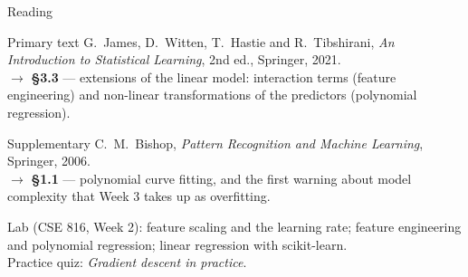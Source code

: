 \documentclass[aspectratio=169,10pt]{beamer}
\begin{document}
\begin{frame}{Reading}
  \begin{block}{Primary text}
    G.~James, D.~Witten, T.~Hastie and R.~Tibshirani,
    \emph{An Introduction to Statistical Learning}, 2nd ed., Springer, 2021.\\[2pt]
    \hfill{\small$\rightarrow$ \textbf{\S3.3} --- extensions of the linear model: interaction
    terms (feature engineering) and non-linear transformations of the predictors
    (polynomial regression).}
  \end{block}
  \begin{block}{Supplementary}
    C.~M.~Bishop, \emph{Pattern Recognition and Machine Learning}, Springer, 2006.\\[2pt]
    \hfill{\small$\rightarrow$ \textbf{\S1.1} --- polynomial curve fitting, and the first
    warning about model complexity that Week 3 takes up as overfitting.}
  \end{block}
  \vspace{2mm}
  \begin{center}
    \small\color{cugray}
    Lab (CSE 816, Week 2): feature scaling and the learning rate; feature engineering and
    polynomial regression; linear regression with scikit-learn.\\
    Practice quiz: \emph{Gradient descent in practice}.
  \end{center}
\end{frame}
\end{document}

